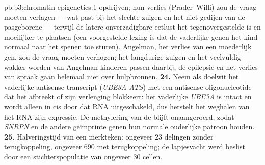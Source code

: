 \begin{solution}{pb:b3:chromatin-epigenetics:1}
opdrijven; hun verlies (Prader--Willi) zou de vraag moeten verlagen ---
wat past bij het slechte zuigen en het niet gedijen van de pasgeborene
--- terwijl de latere onverzadigbare eetlust het tegenovergestelde is
en moeilijker te plaatsen (een voorgestelde lezing is dat de
vaderlijke genen het kind normaal naar het spenen toe sturen).
Angelman, het verlies van een moederlijk gen, zou de vraag moeten
verhogen; het langdurige zuigen en het veelvuldig wakker worden van
Angelman-kinderen passen daarbij, de epilepsie en het verlies van
spraak gaan helemaal niet over hulpbronnen.
\textbf{24.} Neem als doelwit het vaderlijke antisense-transcript
(\emph{UBE3A-ATS}) met een antisense-oligonucleotide dat het afbreekt
of zijn verlenging blokkeert: het vaderlijke \emph{UBE3A} is intact en
wordt alleen in cis door dat RNA uitgeschakeld, dus herstelt het
weghalen van het RNA zijn expressie. De methylering van de
 blijft onaangeroerd, zodat \emph{SNRPN} en de
andere geïmprinte genen hun normale ouderlijke patroon houden.
\textbf{25.} Halveringstijd van een merkteken: ongeveer $23$ delingen
zonder terugkoppeling, ongeveer $690$ met terugkoppeling; de
lapjesvacht werd beslist door een stichterspopulatie van ongeveer $30$
cellen.
\end{solution}
